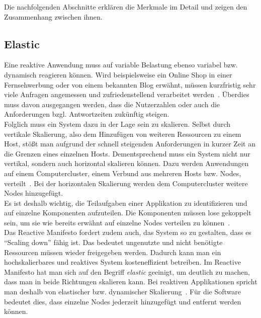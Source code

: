 Die nachfolgenden Abschnitte erklären die Merkmale im Detail und zeigen den Zusammenhang zwischen ihnen.

\pagebreak

\subsection{Elastic}\label{subsec:elastic}
Eine reaktive Anwendung muss auf variable Belastung ebenso variabel bzw. dynamisch reagieren können. Wird beispielsweise ein Online Shop in einer Fernsehwerbung oder von einem bekannten Blog erwähnt, müssen kurzfristig sehr viele Anfragen angemessen und zufriedenstellend verarbeitet werden~\cite[S.~39]{kuhn_reactive_2015}. Überdies muss davon ausgegangen werden, dass die Nutzerzahlen oder auch die Anforderungen bzgl. Antwortzeiten zukünftig steigen.\\
Folglich muss ein System dazu in der Lage sein zu skalieren. Selbst durch vertikale Skalierung, also dem Hinzufügen von weiteren Ressourcen zu einem Host, stößt man aufgrund der schnell steigenden Anforderungen in kurzer Zeit an die Grenzen eines einzelnen Hosts. Dementsprechend muss ein System nicht nur vertikal, sondern auch horizontal skalieren können. Dazu werden Anwendungen auf einem Computercluster, einem Verbund aus mehreren Hosts bzw. Nodes, verteilt~\cite[S.~7]{vernon_reactive_2016}. Bei der horizontalen Skalierung werden dem Computercluster weitere Nodes hinzugefügt.\\
Es ist deshalb wichtig, die Teilaufgaben einer Applikation zu identifizieren und auf einzelne Komponenten aufzuteilen. Die Komponenten müssen lose gekoppelt sein, um sie wie bereits erwähnt auf einzelne Nodes verteilen zu können~\cite[S.~40]{kuhn_reactive_2015}.\\

Das Reactive Manifesto fordert zudem auch, das System so zu gestalten, dass es \enquote{Scaling down} fähig ist. Das bedeutet ungenutzte und nicht benötigte Ressourcen müssen wieder freigegeben werden. Dadurch kann man ein hochskalierbares und reaktives System kosteneffizient betreiben. Im Reactive Manifesto hat man sich auf den Begriff \textit{elastic} geeinigt, um deutlich zu machen, dass man in beide Richtungen skalieren kann. Bei reaktiven Applikationen spricht man deshalb von elastischer bzw. dynamischer Skalierung~\cite[S.~8]{vernon_reactive_2016}. Für die Software bedeutet dies, dass einzelne Nodes jederzeit hinzugefügt und entfernt werden können.\\

